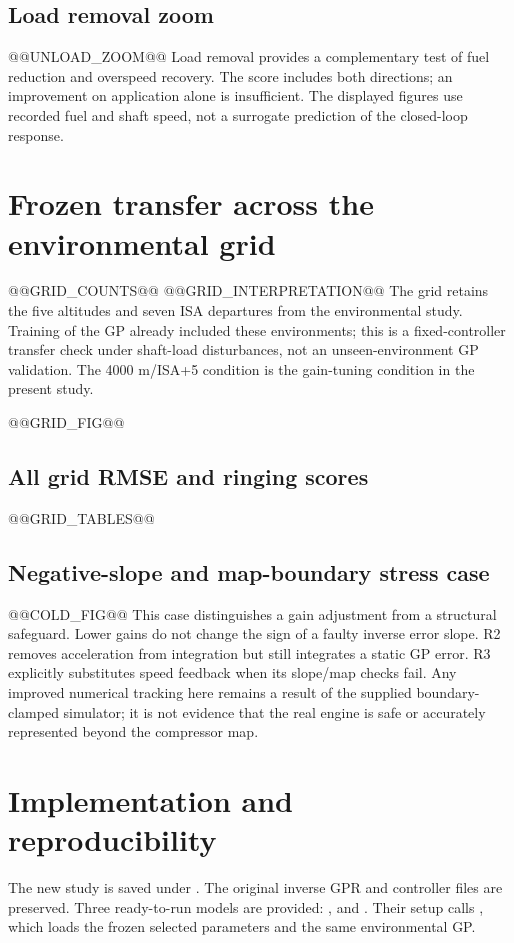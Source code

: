 \clearpage
\subsection{Load removal zoom}
@@UNLOAD_ZOOM@@
Load removal provides a complementary test of fuel reduction and overspeed recovery. The score includes both directions; an improvement on application alone is insufficient. The displayed figures use recorded fuel and shaft speed, not a surrogate prediction of the closed-loop response.

\clearpage
\section{Frozen transfer across the environmental grid}
@@GRID_COUNTS@@
@@GRID_INTERPRETATION@@
The grid retains the five altitudes and seven ISA departures from the environmental study. Training of the GP already included these environments; this is a fixed-controller transfer check under shaft-load disturbances, not an unseen-environment GP validation. The 4000 m/ISA+5 condition is the gain-tuning condition in the present study.

@@GRID_FIG@@

\clearpage
\subsection{All grid RMSE and ringing scores}
@@GRID_TABLES@@

\clearpage
\subsection{Negative-slope and map-boundary stress case}
@@COLD_FIG@@
This case distinguishes a gain adjustment from a structural safeguard. Lower gains do not change the sign of a faulty inverse error slope. R2 removes acceleration from integration but still integrates a static GP error. R3 explicitly substitutes speed feedback when its slope/map checks fail. Any improved numerical tracking here remains a result of the supplied boundary-clamped simulator; it is not evidence that the real engine is safe or accurately represented beyond the compressor map.

\section{Implementation and reproducibility}
The new study is saved under . The original inverse GPR and controller files are preserved. Three ready-to-run models are provided: ,  and . Their setup calls , which loads the frozen selected parameters and the same environmental GP.

